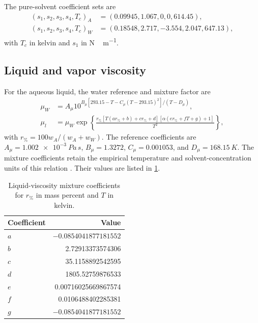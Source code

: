 The pure-solvent coefficient sets are
\begin{align}
(s_1,s_2,s_3,s_4,T_c)_A&=(0.09945,1.067,0,0,614.45),\\
(s_1,s_2,s_3,s_4,T_c)_W&=(0.18548,2.717,-3.554,2.047,647.13),
\end{align}
with $T_c$ in kelvin and $s_1$ in \unit{N\,m^{-1}}.

\subsection{Liquid and vapor viscosity}
For the aqueous liquid, the water reference and mixture factor are
\begin{align}
\mu_W&=A_\mu10^{B_\mu[293.15-T-C_\mu(T-293.15)^2]/(T-D_\mu)},\\
\mu_l&=\mu_W\exp\left\{
\frac{r_\%[T(ar_\%+b)+cr_\%+d][\alpha(er_\%+fT+g)+1]}{T^2}
\right\},
\end{align}
with $r_\%=100w_A/(w_A+w_W)$.
The reference coefficients are $A_\mu=\qty{1.002e-3}{Pa\,s}$, $B_\mu=1.3272$, $C_\mu=0.001053$, and $D_\mu=\qty{168.15}{K}$.
The mixture coefficients retain the empirical temperature and solvent-concentration units of this relation \cite{Morgan2015}.
Their values are listed in \cref{tab:viscosity-mixture-coefficients}.

\begin{table}[pos=htbp]
\centering\small
\caption{Liquid-viscosity mixture coefficients for $r_\%$ in mass percent and $T$ in kelvin.}
\label{tab:viscosity-mixture-coefficients}
\begin{tabular}{@{}lr@{}}
\toprule
Coefficient & Value\\
\midrule
$a$ & $-0.0854041877181552$\\
$b$ & 2.72913373574306\\
$c$ & 35.1158892542595\\
$d$ & 1805.52759876533\\
$e$ & 0.00716025669867574\\
$f$ & 0.0106488402285381\\
$g$ & $-0.0854041877181552$\\
\bottomrule
\end{tabular}
\end{table}

